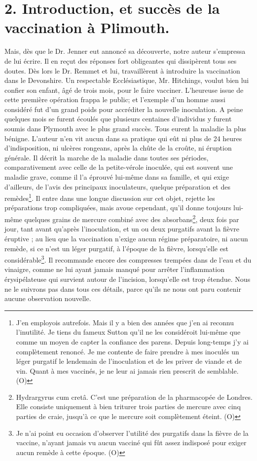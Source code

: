 \section{2. Introduction, et succès de la vaccination à Plimouth.}
Mais, dès que le Dr. Jenner eut annoncé sa découverte, notre auteur s'empressa de lui\setcounter{page}{377} écrire. Il en reçut des réponses fort obligeantes qui dissipèrent tous ses doutes. Dès lors le Dr. Remmet et lui, travaillèrent à introduire la vaccination dans le Devonshire. Un respectable Ecclésiastique, Mr. Hitchings, voulut bien lui confier son enfant, âgé de trois mois, pour le faire vacciner. L'heureuse issue de cette première opération frappa le public; et l'exemple d'un homme aussi considéré fut d'un grand poids pour accréditer la nouvelle inoculation. A peine quelques mois se furent écoulés que plusieurs centaines d'individus y furent soumis dans Plymouth avec le plus grand succès. Tous eurent la maladie la plus bénigne. L'auteur n'en vit aucun dans sa pratique qui eût ni plus de 24 heures d'indisposition, ni ulcères rongeans, après la chûte de la croûte, ni éruption générale.
Il décrit la marche de la maladie dans toutes ses périodes, comparativement avec celle de la petite-vérole inoculée, qui est souvent une maladie grave, comme il l'a éprouvé lui-même dans sa famille, et qui exige d'ailleurs, de l'avis des principaux inoculateurs, quelque préparation et des remèdes\footnote{J'en employois autrefois. Mais il y a bien des années que j'en ai reconnu l'inutilité. Je tiens du fameux Sutton qu'il ne les considéroit lui-même que comme un moyen de capter la confiance des parens. Depuis long-temps j'y ai complètement renoncé. Je me contente de faire prendre à mes inoculés un léger purgatif le lendemain de l'inoculation et de les priver de viande et de vin. Quant à mes vaccinés, je ne leur ai jamais rien prescrit de semblable. (O)}. Il entre dans\setcounter{page}{378} une longue discussion sur cet objet, rejette les préparations trop compliquées, mais avoue cependant, qu'il donne toujours lui-même quelques grains de mercure combiné avec des absorbans\footnote{Hydrargyrus cum cretâ. C'est une préparation de la pharmacopée de Londres. Elle consiste uniquement à bien triturer trois parties de mercure avec cinq parties de craie, jusqu'à ce que le mercure soit complètement éteint.  (O)}, deux fois par jour, tant avant qu'après l'inoculation, et un ou deux purgatifs avant la fièvre éruptive ; au lieu que la vaccination n'exige aucun régime préparatoire, ni aucun remède, si ce n'est un léger purgatif, à l'époque de la fièvre, lorsqu'elle est considérable\footnote{Je n'ai point eu occasion d'observer l'utilité des purgatifs dans la fièvre de la vaccine, n'ayant jamais vu aucun vacciné qui fût assez indisposé pour exiger aucun remède à cette époque.  (O)}. Il recommande encore des compresses trempées dans de l'eau et du vinaigre, comme ne lui ayant jamais manqué pour arrêter l'inflammation érysipélateuse qui survient autour de l'incision, lorsqu'elle est\setcounter{page}{379} trop étendue. Nous ne le suivrons pas dans tous ces détails, parce qu'ils ne nous ont paru contenir aucune observation nouvelle.
